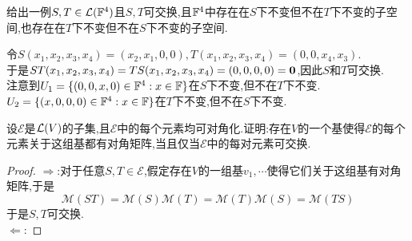 \documentclass{ctexart}
\begin{document}
\pagestyle{empty}
\begin{center}
    \large{}
\end{center}
\begin{problem}[1.]
    给出一例$S,T\in\mathcal{L}(\mathbb{F}^4)$且$S,T$可交换,且$\mathbb{F}^4$中存在在$S$下不变但不在$T$下不变的子空间,也存在在$T$下不变但不在$S$下不变的子空间.
\end{problem}
\begin{solution}
    令$S(x_1,x_2,x_3,x_4)=(x_2,x_1,0,0),T(x_1,x_2,x_3,x_4)=(0,0,x_4,x_3)$.\\
    于是$ST(x_1,x_2,x_3,x_4)=TS(x_1,x_2,x_3,x_4)=(0,0,0,0)=\mathbf0$,因此$S$和$T$可交换.\\
    注意到$U_1=\{(0,0,x,0)\in\mathbb{F}^4:x\in\mathbb{F}\}$在$S$下不变,但不在$T$下不变.\\
    $U_2=\{(x,0,0,0)\in\mathbb{F}^4:x\in\mathbb{F}\}$在$T$下不变,但不在$S$下不变.
\end{solution}
\begin{problem}[2.]
    设$\mathcal{E}$是$\mathcal{L}(V)$的子集,且$\mathcal{E}$中的每个元素均可对角化.证明:存在$V$的一个基使得$\mathcal{E}$的每个元素关于这组基都有对角矩阵,当且仅当$\mathcal{E}$中的每对元素可交换.
\end{problem}
\begin{proof}
    $\Rightarrow$:对于任意$S,T\in\mathcal{E}$,假定存在$V$的一组基$v_1,\cdots$使得它们关于这组基有对角矩阵,于是
    \[\mathcal{M}(ST)=\mathcal{M}(S)\mathcal{M}(T)=\mathcal{M}(T)\mathcal{M}(S)=\mathcal{M}(TS)\]
    于是$S,T$可交换.\\
    $\Leftarrow$:

\end{proof}
\end{document}
